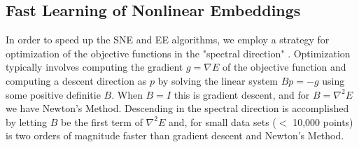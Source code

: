 \documentclass{article}
\begin{document}
%
%
%
%
%
%
%


\subsection{Fast Learning of Nonlinear Embeddings}
In order to speed up the SNE and EE algorithms, we employ a strategy for optimization of the objective functions in the "spectral direction" \cite{Vladymyrov:2012ws}. Optimization typically involves computing the gradient $g = \nabla E$ of the objective function and computing a descent direction as $p$ by solving the linear system $Bp = -g$ using some positive definitie $B$. When $B=I$ this is gradient descent, and for $B=\nabla^2 E$ we have Newton's Method. Descending in the spectral direction is accomplished by letting $B$ be the first term of $\nabla^2 E$ and, for small data sets ($<$ 10,000 points) is two orders of magnitude faster than gradient descent and Newton's Method.
\end{document}
